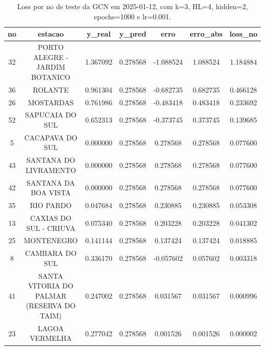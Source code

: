 \begin{table}[h]
\centering
\caption{Loss por no de teste da GCN em 2025-01-12, com k=3, HL=4, hidden=2, epochs=1000 e lr=0.001.}
\label{tab:gcn_loss_k3_hl4_h2_e1000_d20250112}
\begin{tabular}{ccccccc}
\toprule
no & estacao & y\_real & y\_pred & erro & erro\_abs & loss\_no \\
\midrule
32 & PORTO ALEGRE - JARDIM BOTANICO & 1.367092 & 0.278568 & -1.088524 & 1.088524 & 1.184884 \\
36 & ROLANTE & 0.961304 & 0.278568 & -0.682735 & 0.682735 & 0.466128 \\
26 & MOSTARDAS & 0.761986 & 0.278568 & -0.483418 & 0.483418 & 0.233692 \\
52 & SAPUCAIA DO SUL & 0.652313 & 0.278568 & -0.373745 & 0.373745 & 0.139685 \\
5 & CACAPAVA DO SUL & 0.000000 & 0.278568 & 0.278568 & 0.278568 & 0.077600 \\
43 & SANTANA DO LIVRAMENTO & 0.000000 & 0.278568 & 0.278568 & 0.278568 & 0.077600 \\
42 & SANTANA DA BOA VISTA & 0.000000 & 0.278568 & 0.278568 & 0.278568 & 0.077600 \\
35 & RIO PARDO & 0.047684 & 0.278568 & 0.230885 & 0.230885 & 0.053308 \\
13 & CAXIAS DO SUL - CRIUVA & 0.075340 & 0.278568 & 0.203228 & 0.203228 & 0.041302 \\
25 & MONTENEGRO & 0.141144 & 0.278568 & 0.137424 & 0.137424 & 0.018885 \\
8 & CAMBARA DO SUL & 0.336170 & 0.278568 & -0.057602 & 0.057602 & 0.003318 \\
41 & SANTA VITORIA DO PALMAR (RESERVA DO TAIM) & 0.247002 & 0.278568 & 0.031567 & 0.031567 & 0.000996 \\
23 & LAGOA VERMELHA & 0.277042 & 0.278568 & 0.001526 & 0.001526 & 0.000002 \\
\bottomrule
\end{tabular}
\end{table}
